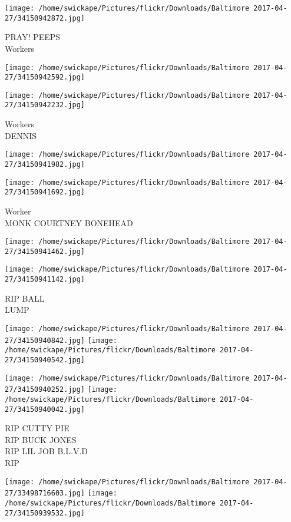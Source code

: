 \documentclass[10pt,letterpaper]{article}
\begin{document}
\vspace{0.25in}
\texttt{[image: /home/swickape/Pictures/flickr/Downloads/Baltimore 2017-04-27/34150942872.jpg]}

PRAY!  PEEPS\\
Workers
\pagebreak

\texttt{[image: /home/swickape/Pictures/flickr/Downloads/Baltimore 2017-04-27/34150942592.jpg]}

\vspace{0.25in}
\texttt{[image: /home/swickape/Pictures/flickr/Downloads/Baltimore 2017-04-27/34150942232.jpg]}

Workers\\
DENNIS
\pagebreak

\texttt{[image: /home/swickape/Pictures/flickr/Downloads/Baltimore 2017-04-27/34150941982.jpg]}

\vspace{0.25in}
\texttt{[image: /home/swickape/Pictures/flickr/Downloads/Baltimore 2017-04-27/34150941692.jpg]}

Worker\\
MONK COURTNEY BONEHEAD
\pagebreak

\texttt{[image: /home/swickape/Pictures/flickr/Downloads/Baltimore 2017-04-27/34150941462.jpg]}

\vspace{0.25in}
\texttt{[image: /home/swickape/Pictures/flickr/Downloads/Baltimore 2017-04-27/34150941142.jpg]}

RIP BALL\\
LUMP
\pagebreak

\texttt{[image: /home/swickape/Pictures/flickr/Downloads/Baltimore 2017-04-27/34150940842.jpg]}
\texttt{[image: /home/swickape/Pictures/flickr/Downloads/Baltimore 2017-04-27/34150940542.jpg]}

\texttt{[image: /home/swickape/Pictures/flickr/Downloads/Baltimore 2017-04-27/34150940252.jpg]}
\texttt{[image: /home/swickape/Pictures/flickr/Downloads/Baltimore 2017-04-27/34150940042.jpg]}

RIP CUTTY PIE\\
RIP BUCK JONES\\
RIP LIL JOB B.L.V.D\\
RIP
\pagebreak

\texttt{[image: /home/swickape/Pictures/flickr/Downloads/Baltimore 2017-04-27/33498716603.jpg]}
\texttt{[image: /home/swickape/Pictures/flickr/Downloads/Baltimore 2017-04-27/34150939532.jpg]}
\end{document}
